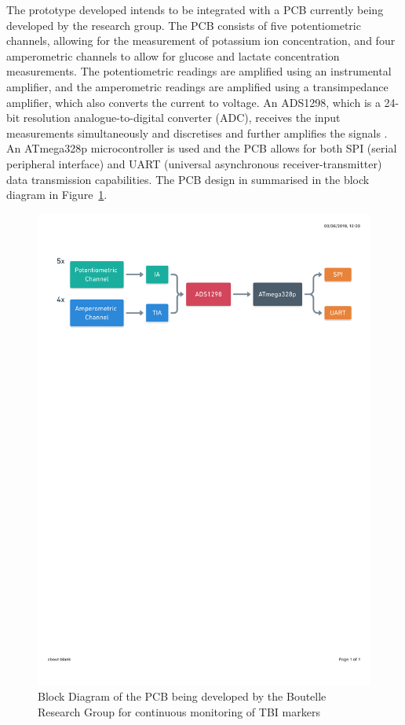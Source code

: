 The prototype developed intends to be integrated with a PCB currently being developed by the research group. The PCB consists of five potentiometric channels, allowing for the measurement of potassium ion concentration, and four amperometric channels to allow for glucose and lactate concentration measurements. The potentiometric readings are amplified using an instrumental amplifier, and the amperometric readings are amplified using a transimpedance amplifier, which also converts the current to voltage. An ADS1298, which is a 24-bit resolution analogue-to-digital converter (ADC), receives the input measurements simultaneously and discretises and further amplifies the signals \cite{TexasInstruments2010}. An ATmega328p microcontroller is used and the PCB allows for both SPI (serial peripheral interface) and UART (universal asynchronous receiver-transmitter) data transmission capabilities. The PCB design in summarised in the block diagram in Figure~\ref{fig: PCB block diagram}.

\begin{figure}[H]
\centering
\includegraphics[trim={0cm 22cm 0.5cm  2.5cm}, clip, width=1\textwidth]{./figures/CircuitBlockDiagram.pdf}
\captionsetup{justification=centering}
\caption{Block Diagram of the PCB being developed by the Boutelle Research Group for continuous monitoring of TBI markers}
\label{fig: PCB block diagram}
\end{figure}


